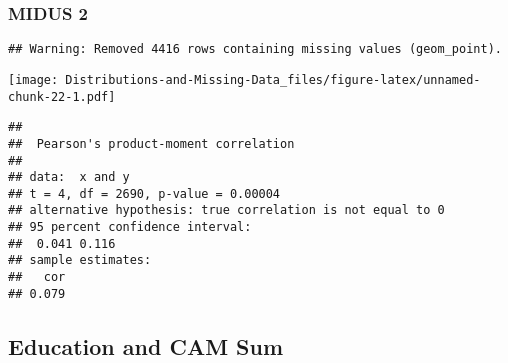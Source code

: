 \documentclass[
]{article}
\begin{document}
\hypertarget{midus-2-1}{%
\subsubsection{MIDUS 2}\label{midus-2-1}}

\begin{verbatim}
## Warning: Removed 4416 rows containing missing values (geom_point).
\end{verbatim}

\texttt{[image: Distributions-and-Missing-Data\_files/figure-latex/unnamed-chunk-22-1.pdf]}

\begin{verbatim}
## 
##  Pearson's product-moment correlation
## 
## data:  x and y
## t = 4, df = 2690, p-value = 0.00004
## alternative hypothesis: true correlation is not equal to 0
## 95 percent confidence interval:
##  0.041 0.116
## sample estimates:
##   cor 
## 0.079
\end{verbatim}

\hypertarget{education-and-cam-sum}{%
\subsection{Education and CAM Sum}\label{education-and-cam-sum}}
\end{document}
